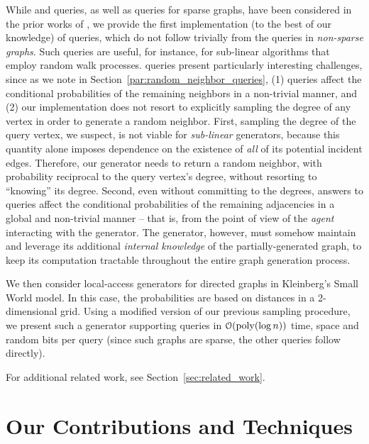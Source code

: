 While  and  queries, as well as  queries for sparse graphs,
have been considered in the prior works of \cite{reut, huge_old, huge, sparse}, we provide the first implementation (to the best of our knowledge)
of  queries, which do not follow trivially from the  queries in \emph{non-sparse graphs}.
Such queries are useful, for instance, for sub-linear algorithms that employ random walk processes.
 queries present particularly interesting challenges,  since as we note in Section~\ref{par:random_neighbor_queries},
(1)  queries affect the conditional probabilities of the remaining neighbors in a non-trivial manner, and
(2) our implementation does not resort to explicitly sampling the degree of any vertex in order to generate a random neighbor.
First, sampling the degree of the query vertex, we suspect, is not viable for \emph{sub-linear} generators,
because this quantity alone imposes dependence on the existence of \emph{all} of its potential incident edges.
Therefore, our generator needs to return a random neighbor, with probability reciprocal to the query vertex's degree,
without resorting to ``knowing'' its degree.
Second, even without committing to the degrees, answers to  queries
affect the conditional probabilities of the remaining adjacencies in a global and non-trivial manner
-- that is, from the point of view of the \emph{agent} interacting with the generator.
The generator, however, must somehow maintain and leverage its additional \emph{internal knowledge}
of the partially-generated graph, to keep its computation tractable throughout the entire graph generation process.

We then consider local-access generators for directed graphs in Kleinberg's Small World model.
In this case, the probabilities are based on distances in a 2-dimensional grid.
Using a modified version of our previous sampling procedure, we present such a generator supporting  queries in
$\mathcal{O}(\mathrm{poly}(\log n))$ time, space and random bits per query (since such graphs are sparse, the other queries follow directly).

For additional related work, see Section~\ref{sec:related_work}.




\section{Our Contributions and Techniques}

